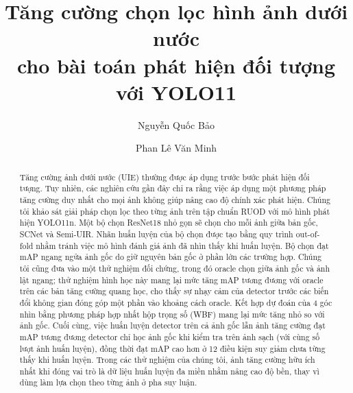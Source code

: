 \documentclass[runningheads]{llncs}
\begin{document}
\title{Tăng cường chọn lọc hình ảnh dưới nước\\cho bài toán phát hiện đối tượng với YOLO11}

\author{Nguyễn Quốc Bảo \and Phan Lê Văn Minh}


\maketitle

\begin{abstract}
    Tăng cường ảnh dưới nước (UIE) thường được áp dụng trước bước phát hiện đối tượng. Tuy nhiên, các nghiên cứu gần đây chỉ ra rằng việc áp dụng một phương pháp tăng cường duy nhất cho mọi ảnh không giúp nâng cao độ chính xác phát hiện. Chúng tôi khảo sát giải pháp chọn lọc theo từng ảnh trên tập chuẩn RUOD với mô hình phát hiện YOLO11n. Một bộ chọn ResNet18 nhỏ gọn sẽ chọn cho mỗi ảnh giữa bản gốc, SCNet và Semi-UIR. Nhãn huấn luyện của bộ chọn được tạo bằng quy trình out-of-fold nhằm tránh việc mô hình đánh giá ảnh đã nhìn thấy khi huấn luyện. Bộ chọn đạt mAP ngang ngửa ảnh gốc do giữ nguyên bản gốc ở phần lớn các trường hợp. Chúng tôi cũng đưa vào một thử nghiệm đối chứng, trong đó oracle chọn giữa ảnh gốc và ảnh lật ngang; thử nghiệm hình học này mang lại mức tăng mAP tương đương với oracle trên các bản tăng cường quang học, cho thấy sự nhạy cảm của detector trước các biến đổi không gian đóng góp một phần vào khoảng cách oracle. Kết hợp dự đoán của 4 góc nhìn bằng phương pháp hợp nhất hộp trọng số (WBF) mang lại mức tăng nhỏ so với ảnh gốc. Cuối cùng, việc huấn luyện detector trên cả ảnh gốc lẫn ảnh tăng cường đạt mAP tương đương detector chỉ học ảnh gốc khi kiểm tra trên ảnh sạch (với cùng số lượt ảnh huấn luyện), đồng thời đạt mAP cao hơn ở 12 điều kiện suy giảm chưa từng thấy khi huấn luyện. Trong các thử nghiệm của chúng tôi, ảnh tăng cường hữu ích nhất khi đóng vai trò là dữ liệu huấn luyện đa miền nhằm nâng cao độ bền, thay vì dùng làm lựa chọn theo từng ảnh ở pha suy luận.

\end{abstract}
\end{document}
